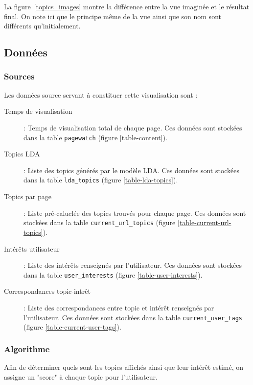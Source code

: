 		La figure~\ref{topics_images} montre la différence entre la vue imaginée et le résultat final. On note ici que le principe même de la vue ainsi que son nom sont différents qu'initialement.

	\subsection{Données}

		\subsubsection{Sources}

			Les données source servant à constituer cette visualisation sont :
			\begin{description}
				\item[Temps de visualisation] : Temps de visualisation total de chaque page. Ces données sont stockées dans la table \texttt{pagewatch} (figure \ref{table-content}).
				\item[Topics LDA] : Liste des topics générés par le modèle LDA. Ces données sont stockées dans la table \texttt{lda\_topics} (figure \ref{table-lda-topics}).
				\item[Topics par page] : Liste pré-caluclée des topics trouvés pour chaque page. Ces données sont stockées dans la table \texttt{current\_url\_topics} (figure \ref{table-current-url-topics}).
				\item[Intérêts utilisateur] : Liste des intérêts renseignés par l'utilisateur. Ces données sont stockées dans la table \texttt{user\_interests} (figure \ref{table-user-interests}).
				\item[Correspondances topic-intrêt] : Liste des correspondances entre topic et intérêt renseignés par l'utilisateur. Ces données sont stockées dans la table \texttt{current\_user\_tags} (figure \ref{table-current-user-tags}).
			\end{description}

		\subsubsection{Algorithme}

			Afin de déterminer quels sont les topics affichés ainsi que leur intérêt estimé, on assigne un "score" à chaque topic pour l'utilisateur.

